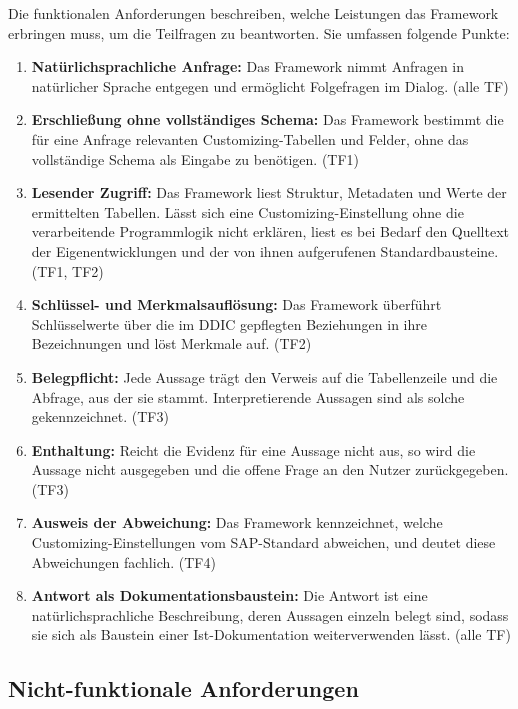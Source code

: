 Die funktionalen Anforderungen beschreiben, welche Leistungen das Framework erbringen muss, um die Teilfragen zu beantworten. Sie umfassen folgende Punkte:
\begin{enumerate}
	\item[\textbf{FA1}] \textbf{Natürlichsprachliche Anfrage:} Das Framework nimmt Anfragen in natürlicher Sprache entgegen und ermöglicht Folgefragen im Dialog. (alle TF)
	\item[\textbf{FA2}] \textbf{Erschließung ohne vollständiges Schema:} Das Framework bestimmt die für eine Anfrage relevanten Customizing-Tabellen und Felder, ohne das vollständige Schema als Eingabe zu benötigen. (TF1)
	\item[\textbf{FA3}] \textbf{Lesender Zugriff:} Das Framework liest Struktur, Metadaten und Werte der ermittelten Tabellen. Lässt sich eine Customizing-Einstellung ohne die verarbeitende Programmlogik nicht erklären, liest es bei Bedarf den Quelltext der Eigenentwicklungen und der von ihnen aufgerufenen Standardbausteine. (TF1, TF2)
	\item[\textbf{FA4}] \textbf{Schlüssel- und Merkmalsauflösung:} Das Framework überführt Schlüsselwerte über die im DDIC gepflegten Beziehungen in ihre Bezeichnungen und löst Merkmale auf. (TF2)
	\item[\textbf{FA5}] \textbf{Belegpflicht:} Jede Aussage trägt den Verweis auf die Tabellenzeile und die Abfrage, aus der sie stammt. Interpretierende Aussagen sind als solche gekennzeichnet. (TF3)
	\item[\textbf{FA6}] \textbf{Enthaltung:} Reicht die Evidenz für eine Aussage nicht aus, so wird die Aussage nicht ausgegeben und die offene Frage an den Nutzer zurückgegeben. (TF3)
	\item[\textbf{FA7}] \textbf{Ausweis der Abweichung:} Das Framework kennzeichnet, welche Customizing-Einstellungen vom SAP-Standard abweichen, und deutet diese Abweichungen fachlich. (TF4)
	\item[\textbf{FA8}] \textbf{Antwort als Dokumentationsbaustein:} Die Antwort ist eine natürlichsprachliche Beschreibung, deren Aussagen einzeln belegt sind, sodass sie sich als Baustein einer Ist-Dokumentation weiterverwenden lässt. (alle TF)
\end{enumerate}

\subsection{Nicht-funktionale Anforderungen}
\label{subsec:anf-nichtfunktional}

